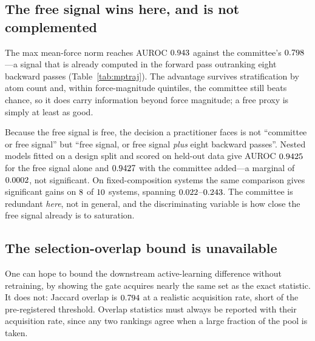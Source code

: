 \begin{table}[t]
\centering
\caption{\textbf{On a real materials pool a free signal outranks every committee
statistic.} AUROC on $\fsMPtrajN$ MPtraj crystals under a frozen foundation-model
trunk. The last two columns are post-hoc diagnostics: AUROC recomputed within
atom-count quartiles and within force-magnitude quintiles, so neither the
extensivity confound nor force magnitude itself can explain the ordering.
$\|\bar{f}\|$ is bold because it is the signal that costs nothing.}
\label{tab:mptraj}
\small

\end{table}

\subsection{The free signal wins here, and is not complemented}
The max mean-force norm reaches AUROC $0.943$ against the committee's
$0.798$---a signal that is already computed in the forward pass
outranking eight backward passes (Table~\ref{tab:mptraj}). The advantage survives stratification by atom
count and, within force-magnitude quintiles, the committee still beats chance,
so it does carry information beyond force magnitude; a free proxy is simply at
least as good.

Because the free signal is free, the decision a practitioner faces is not
``committee or free signal'' but ``free signal, or free signal \emph{plus} eight
backward passes''. Nested models fitted on a design split and scored on held-out
data give AUROC $0.9425$ for the free signal alone and $0.9427$ with the
committee added---a marginal of $0.0002$, not significant. On
fixed-composition systems the same comparison gives significant gains on
$8$ of $10$ systems, spanning
$0.022$--$0.243$. The committee is redundant \emph{here}, not
in general, and the discriminating variable is how close the free signal already
is to saturation.

\subsection{The selection-overlap bound is unavailable}
One can hope to bound the downstream active-learning difference without
retraining, by showing the gate acquires nearly the same set as the exact
statistic. It does not: Jaccard overlap is $0.794$ at a realistic
acquisition rate, short of the pre-registered threshold. Overlap statistics must
always be reported with their acquisition rate, since any two rankings agree when
a large fraction of the pool is taken.



